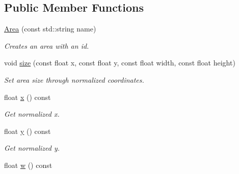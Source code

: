 \subsection*{Public Member Functions}
\begin{DoxyCompactItemize}
\item 
\hypertarget{classArea_a39ed8e167060ddbed945fdb0b922fe75}{
\hyperlink{classArea_a39ed8e167060ddbed945fdb0b922fe75}{Area} (const std::string name)}
\label{classArea_a39ed8e167060ddbed945fdb0b922fe75}

\begin{DoxyCompactList}\small\item\em Creates an area with an id. \item\end{DoxyCompactList}\item 
\hypertarget{classArea_ae55e508f8abe6e0ad469d93ca53bef74}{
void \hyperlink{classArea_ae55e508f8abe6e0ad469d93ca53bef74}{size} (const float x, const float y, const float width, const float height)}
\label{classArea_ae55e508f8abe6e0ad469d93ca53bef74}

\begin{DoxyCompactList}\small\item\em Set area size through normalized coordinates. \item\end{DoxyCompactList}\item 
\hypertarget{classArea_a1ce9f43662004343d6db243ce8dbfd16}{
float \hyperlink{classArea_a1ce9f43662004343d6db243ce8dbfd16}{x} () const }
\label{classArea_a1ce9f43662004343d6db243ce8dbfd16}

\begin{DoxyCompactList}\small\item\em Get normalized x. \item\end{DoxyCompactList}\item 
\hypertarget{classArea_aff58afe8ecd2aae6135d0d56bdf842a2}{
float \hyperlink{classArea_aff58afe8ecd2aae6135d0d56bdf842a2}{y} () const }
\label{classArea_aff58afe8ecd2aae6135d0d56bdf842a2}

\begin{DoxyCompactList}\small\item\em Get normalized y. \item\end{DoxyCompactList}\item 
\hypertarget{classArea_a0e5a99a595cc786377f2f9a0e3b2e832}{
float \hyperlink{classArea_a0e5a99a595cc786377f2f9a0e3b2e832}{w} () const }
\label{classArea_a0e5a99a595cc786377f2f9a0e3b2e832}


\end{DoxyCompactItemize}

